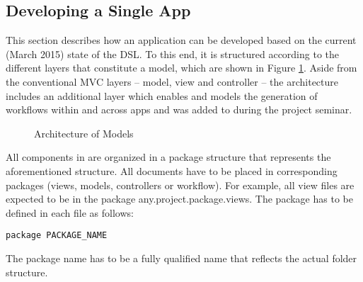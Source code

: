

\subsection{Developing a Single App} 
\label{subsec:SingleAppDev}
This section describes how an application can be developed based on the current (March 2015) state of the \MD DSL. To this end, it is structured according to the different layers that constitute a \MD model, which are shown in Figure \ref{fig:MD2Arch}. Aside from the conventional MVC layers -- model, view and controller -- the architecture includes an additional layer which enables and models the generation of workflows within and across apps and was added to \MD during the project seminar.


\begin{figure}[htb!]
\centering
{}
\caption{Architecture of \MD Models}
\label{fig:MD2Arch}
\end{figure}

All components in \MD are organized in a package structure that represents the aforementioned structure. All documents have to be placed in corresponding packages (views, models, controllers or workflow). For example, all view files are expected to be in the package any.project.package.views. The package has to be defined in each \MD file as follows:
\begin{lstlisting}
package PACKAGE_NAME
\end{lstlisting}
The package name has to be a fully qualified name that reflects the actual folder structure.

